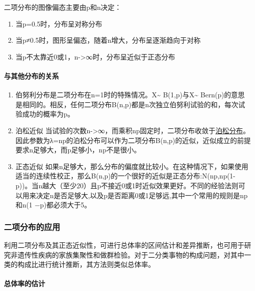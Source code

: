 \documentclass[
]{article}
\providecommand{\tightlist}{%
  \setlength{\itemsep}{0pt}\setlength{\parskip}{0pt}}
\begin{document}
二项分布的图像偏态主要由p和n决定：

\begin{enumerate}
\def\labelenumi{\arabic{enumi}.}
\tightlist
\item
  当p=0.5时，分布呈对称分布
\item
  当p≠0.5时，图形呈偏态，随着n增大，分布呈逐渐趋向于对称
\item
  当p不太靠近0或1，n-\textgreater∞时，分布呈近似于正态分布
\end{enumerate}

\hypertarget{ux4e0eux5176ux4ed6ux5206ux5e03ux7684ux5173ux7cfb}{%
\paragraph{与其他分布的关系}\label{ux4e0eux5176ux4ed6ux5206ux5e03ux7684ux5173ux7cfb}}

\begin{enumerate}
\def\labelenumi{\arabic{enumi}.}
\tightlist
\item
  伯努利分布是二项分布在n=1时的特殊情况。X\textasciitilde{} B(1,p)与X\textasciitilde{} Bern(p)的意思是相同的。相反，任何二项分布B(n,p)都是n次独立伯努利试验的和，每次试验成功的概率为p。
\item
  泊松近似 当试验的次数n-\textgreater∞，而乘积np固定时，二项分布收敛于\href{https://zh.wikipedia.org/zh-hans/\%E6\%B3\%8A\%E6\%9D\%BE\%E5\%88\%86\%E4\%BD\%88}{泊松分布}。因此参数为λ=np的泊松分布可以作为二项分布B(n,p)的近似，近似成立的前提要求n足够大，而p足够小，np不是很小。
\item
  正态近似 如果n足够大，那么分布的偏度就比较小。在这种情况下，如果使用适当的连续性校正，那么B(n,p)的一个很好的近似是正态分布:N(np,np(1-p))。当n越大（至少20）且p不接近0或1时近似效果更好。不同的经验法则可以用来决定n是否足够大,以及p是否距离0或1足够远,其中一个常用的规则是np和n(1 −p)都必须大于5。
\end{enumerate}

\hypertarget{ux4e8cux9879ux5206ux5e03ux7684ux5e94ux7528}{%
\subsubsection{二项分布的应用}\label{ux4e8cux9879ux5206ux5e03ux7684ux5e94ux7528}}

利用二项分布及其正态近似性，可进行总体率的区间估计和差异推断，也可用于研究非遗传性疾病的家族集聚性和做群检验。对于二分类事物的构成问题，对其中一类的构成比进行统计推断，其方法则类似总体率。

\hypertarget{ux603bux4f53ux7387ux7684ux4f30ux8ba1}{%
\paragraph{总体率的估计}\label{ux603bux4f53ux7387ux7684ux4f30ux8ba1}}
\end{document}
